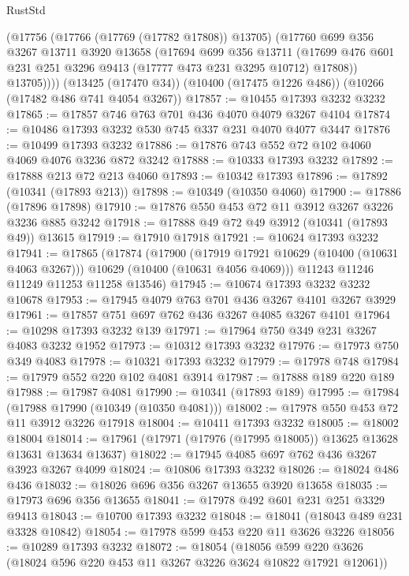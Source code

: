 \begin{lexlean}{RustStd}
\begin{coremodule}
        (@17756
          (@17766 (@17769 (@17782 @17808)) @13705)
          (@17760
            @699
            @356
            @3267
            @13711
            @3920
            @13658
            (@17694
              @699
              @356
              @13711
              (@17699 @476 @601 @231 @251 @3296 @9413 (@17777 @473 @231 @3295 @10712) @17808))
            @13705))))
    (@13425 (@17470 @34))
    (@10400 (@17475 @1226 @486))
    (@10266 (@17482 @486 @741 @4054 @3267))
@17857 := @10455 @17393 @3232 @3232
@17865 := @17857 @746 @763 @701 @436 @4070 @4079 @3267 @4104
@17874 := @10486 @17393 @3232 @530 @745 @337 @231 @4070 @4077 @3447
@17876 := @10499 @17393 @3232
@17886 := @17876 @743 @552 @72 @102 @4060 @4069 @4076 @3236 @872 @3242
@17888 := @10333 @17393 @3232
@17892 := @17888 @213 @72 @213 @4060
@17893 := @10342 @17393
@17896 := @17892 (@10341 (@17893 @213))
@17898 := @10349 (@10350 @4060)
@17900 := @17886 (@17896 @17898)
@17910 := @17876 @550 @453 @72 @11 @3912 @3267 @3226 @3236 @885 @3242
@17918 := @17888 @49 @72 @49 @3912 (@10341 (@17893 @49)) @13615
@17919 := @17910 @17918
@17921 := @10624 @17393 @3232
@17941 := @17865
    (@17874
      (@17900
        (@17919 @17921 @10629 (@10400 (@10631 @4063 @3267)))
        @10629
        (@10400 (@10631 @4056 @4069)))
      @11243
      @11246
      @11249
      @11253
      @11258
      @13546)
@17945 := @10674 @17393 @3232 @3232 @10678
@17953 := @17945 @4079 @763 @701 @436 @3267 @4101 @3267 @3929
@17961 := @17857 @751 @697 @762 @436 @3267 @4085 @3267 @4101
@17964 := @10298 @17393 @3232 @139
@17971 := @17964 @750 @349 @231 @3267 @4083 @3232 @1952
@17973 := @10312 @17393 @3232
@17976 := @17973 @750 @349 @4083
@17978 := @10321 @17393 @3232
@17979 := @17978 @748
@17984 := @17979 @552 @220 @102 @4081 @3914
@17987 := @17888 @189 @220 @189
@17988 := @17987 @4081
@17990 := @10341 (@17893 @189)
@17995 := @17984 (@17988 @17990 (@10349 (@10350 @4081)))
@18002 := @17978 @550 @453 @72 @11 @3912 @3226 @17918
@18004 := @10411 @17393 @3232
@18005 := @18002 @18004
@18014 := @17961 (@17971 (@17976 (@17995 @18005)) @13625 @13628 @13631 @13634 @13637)
@18022 := @17945 @4085 @697 @762 @436 @3267 @3923 @3267 @4099
@18024 := @10806 @17393 @3232
@18026 := @18024 @486 @436
@18032 := @18026 @696 @356 @3267 @13655 @3920 @13658
@18035 := @17973 @696 @356 @13655
@18041 := @17978 @492 @601 @231 @251 @3329 @9413
@18043 := @10700 @17393 @3232
@18048 := @18041 (@18043 @489 @231 @3328 @10842)
@18054 := @17978 @599 @453 @220 @11 @3626 @3226
@18056 := @10289 @17393 @3232
@18072 := @18054
    (@18056 @599 @220 @3626 (@18024 @596 @220 @453 @11 @3267 @3226 @3624 @10822 @17921 @12061))

\end{coremodule}
\end{lexlean}
